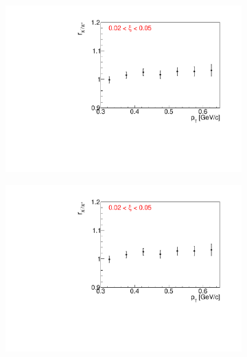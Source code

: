 \begin{figure}[h!]
\begin{subfigure}{.32\textwidth}
	\end{subfigure}
	\begin{subfigure}{.32\textwidth}
		\includegraphics[width=\linewidth, page=8]{chapters/chrgSTAR/img/dEdx/fit2019_fitResult_1_0_step_0.pdf}
	\end{subfigure}
	\begin{subfigure}{.32\textwidth}
		\includegraphics[width=\linewidth, page=11]{chapters/chrgSTAR/img/dEdx/fit2019_fitResult_1_0_step_0.pdf}
	\end{subfigure}
	\begin{subfigure}{.32\textwidth}

\end{subfigure}
\end{figure}
